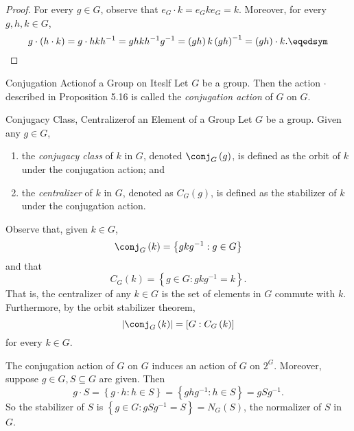 \documentclass[pmath347]{subfiles}
\begin{document}
    \begin{proof}
        For every $g\in G$, observe that $e_G\cdot k = e_Gke_G = k$. Moreover, for every $g,h,k\in G$,
        \begin{equation*}
            g\cdot\left( h\cdot k \right) = g\cdot hkh^{-1} = ghkh^{-1} g^{-1} = \left( gh \right) k\left( gh \right) ^{-1} = \left( gh \right) \cdot k. \eqedsym
        \end{equation*}
    \end{proof}

    \begin{definition}{Conjugation Action}{of a Group on Iteslf}
        Let $G$ be a group. Then the action $\cdot$ described in Proposition 5.16 is called the \emph{conjugation action} of $G$ on $G$.
    \end{definition}

    \begin{definition}{Conjugacy Class, Centralizer}{of an Element of a Group}
        Let $G$ be a group. Given any $g\in G$, 
        \begin{enumerate}
            \item the \emph{conjugacy class} of $k$ in $G$, denoted $\conj_G\left( g \right)$, is defined as the orbit of $k$ under the conjugation action; and 
            \item the \emph{centralizer} of $k$ in $G$, denoted as $C_G\left( g \right)$, is defined as the stabilizer of $k$ under the conjugation action.
        \end{enumerate}
    \end{definition}

    \np Observe that, given $k\in G$,
    \begin{equation*}
        \conj_G\left( k \right) = \left\lbrace gkg^{-1} :g\in G \right\rbrace 
    \end{equation*}
    and that
    \begin{equation*}
        C_G\left( k \right) = \left\lbrace g\in G: gkg^{-1} =k \right\rbrace.
    \end{equation*}
    That is, the centralizer of any $k\in G$ is the set of elements in $G$ commute with $k$. Furthermore, by the orbit stabilizer theorem,
    \begin{equation*}
        \left| \conj_G\left( k \right)  \right| = \left[ G:C_G\left( k \right)  \right] 
    \end{equation*}
    for every $k\in G$.

    \np The conjugation action of $G$ on $G$ induces an action of $G$ on $2^G$. Moreover, suppose $g\in G, S\subseteq G$ are given. Then
    \begin{equation*}
        g\cdot S = \left\lbrace g\cdot h:h\in S \right\rbrace = \left\lbrace ghg^{-1} :h\in S \right\rbrace = gSg^{-1} .
    \end{equation*}
    So the stabilizer of $S$ is $\left\lbrace g\in G: gSg^{-1} = S \right\rbrace = N_G\left( S \right)$, the normalizer of $S$ in $G$.
\end{document}
